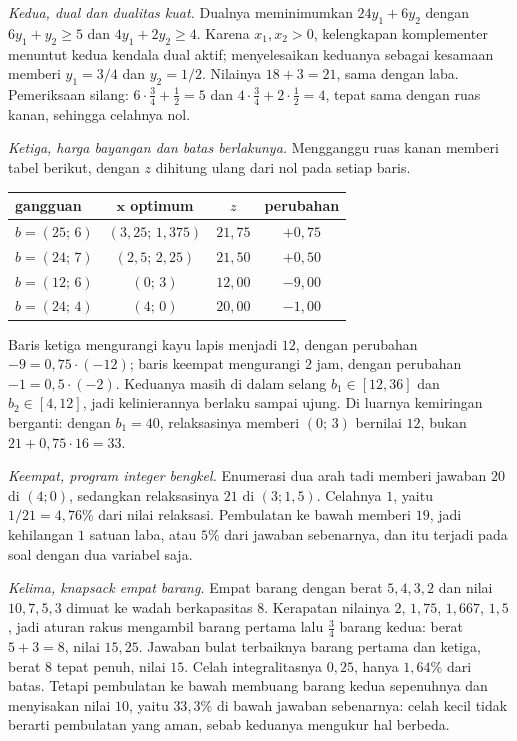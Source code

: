 \emph{Kedua, dual dan dualitas kuat.} Dualnya meminimumkan $24y_{1}+6y_{2}$ dengan
$6y_{1}+y_{2}\ge5$ dan $4y_{1}+2y_{2}\ge4$. Karena $x_{1},x_{2}>0$, kelengkapan
komplementer menuntut kedua kendala dual aktif; menyelesaikan keduanya sebagai kesamaan
memberi $y_{1}=3/4$ dan $y_{2}=1/2$. Nilainya $18+3=21$, sama dengan laba. Pemeriksaan silang:
$6\cdot\tfrac34+\tfrac12=5$ dan $4\cdot\tfrac34+2\cdot\tfrac12=4$, tepat sama dengan ruas
kanan, sehingga celahnya nol.

\emph{Ketiga, harga bayangan dan batas berlakunya.} Mengganggu ruas kanan memberi
tabel berikut, dengan $z$ dihitung ulang dari nol pada setiap baris.
\begin{center}
\begin{tabular}{lccc}
\hline
gangguan & $\mathbf{x}$ optimum & $z$ & perubahan \\
\hline
$b=(25;\,6)$ & $(3{,}25;\,1{,}375)$ & $21{,}75$ & $+0{,}75$ \\
$b=(24;\,7)$ & $(2{,}5;\,2{,}25)$ & $21{,}50$ & $+0{,}50$ \\
$b=(12;\,6)$ & $(0;\,3)$ & $12{,}00$ & $-9{,}00$ \\
$b=(24;\,4)$ & $(4;\,0)$ & $20{,}00$ & $-1{,}00$ \\
\hline
\end{tabular}
\end{center}
Baris ketiga mengurangi kayu lapis menjadi $12$, dengan perubahan
$-9=0{,}75\cdot(-12)$; baris keempat mengurangi $2$ jam, dengan perubahan
$-1=0{,}5\cdot(-2)$. Keduanya masih di dalam selang $b_{1}\in[12,36]$ dan
$b_{2}\in[4,12]$, jadi kelinierannya berlaku sampai ujung. Di luarnya kemiringan berganti:
dengan $b_{1}=40$, relaksasinya memberi $(0;\,3)$ bernilai $12$, bukan
$21+0{,}75\cdot16=33$.

\emph{Keempat, program integer bengkel.} Enumerasi dua arah tadi memberi jawaban $20$ di
$(4;0)$, sedangkan relaksasinya $21$ di $(3;1{,}5)$. Celahnya $1$, yaitu
$1/21=4{,}76\%$ dari nilai relaksasi. Pembulatan ke bawah memberi $19$, jadi kehilangan
$1$ satuan laba, atau $5\%$ dari jawaban sebenarnya, dan itu terjadi pada soal dengan dua
variabel saja.

\emph{Kelima, knapsack empat barang.} Empat barang dengan berat $5,4,3,2$ dan
nilai $10,7,5,3$ dimuat ke wadah berkapasitas $8$. Kerapatan nilainya $2$, $1{,}75$,
$1{,}667$, $1{,}5$, jadi aturan rakus mengambil barang pertama lalu $\tfrac34$ barang kedua:
berat $5+3=8$, nilai $15{,}25$. Jawaban bulat terbaiknya barang pertama dan ketiga, berat $8$
tepat penuh, nilai $15$. Celah integralitasnya $0{,}25$, hanya $1{,}64\%$ dari batas. Tetapi
pembulatan ke bawah membuang barang kedua sepenuhnya dan menyisakan nilai $10$, yaitu
$33{,}3\%$ di bawah jawaban sebenarnya: celah kecil tidak berarti pembulatan yang aman, sebab
keduanya mengukur hal berbeda.

